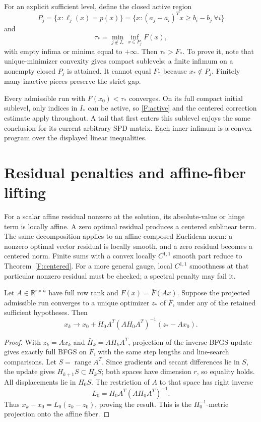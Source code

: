 For an explicit sufficient level, define the closed active region
\[
 P_j=\{x:\ell_j(x)=p(x)\}
 =\{x:(a_j-a_i)^Tx\ge b_i-b_j\ \forall i\}
\]
and
\begin{equation}\label{F:basin}
 \tau_* =\min_{j\notin I_*}\inf_{x\in P_j}F(x),
\end{equation}
with empty infima or minima equal to $+\infty$. Then $\tau_*>F_*$. To prove it, note that unique-minimizer convexity gives compact sublevels; a finite infimum on a nonempty closed $P_j$ is attained. It cannot equal $F_*$ because $x_*\notin P_j$. Finitely many inactive pieces preserve the strict gap.

Every admissible run with $F(x_0)<\tau_*$ converges. On its full compact initial sublevel, only indices in $I_*$ can be active, so \eqref{F:active} and the centered correction estimate apply throughout. A tail that first enters this sublevel enjoys the same conclusion for its current arbitrary SPD matrix. Each inner infimum is a convex program over the displayed linear inequalities.



\section{Residual penalties and affine-fiber lifting}

For a scalar affine residual nonzero at the solution, its absolute-value or hinge term is locally affine. A zero optimal residual produces a centered sublinear term. The same decomposition applies to an affine-composed Euclidean norm: a nonzero optimal vector residual is locally smooth, and a zero residual becomes a centered norm. Finite sums with a convex locally $C^{1,1}$ smooth part reduce to Theorem~\ref{F:centered}. For a more general gauge, local $C^{1,1}$ smoothness at that particular nonzero residual must be checked; a spectral penalty may fail it.

\begin{theorem}\label{F:lifting}
Let $A\in\mathbb R^{r\times n}$ have full row rank and $F(x)=\bar F(Ax)$. Suppose the projected admissible run converges to a unique optimizer $z_*$ of $\bar F$, under any of the retained sufficient hypotheses. Then
\[
 x_k\to x_0+H_0A^T(AH_0A^T)^{-1}(z_*-Ax_0).
\]
\end{theorem}
\begin{proof}
With $z_k=Ax_k$ and $\bar H_k=AH_kA^T$, projection of the inverse-BFGS update gives exactly full BFGS on $\bar F$, with the same step lengths and line-search comparisons. Let $S=\operatorname{range}A^T$. Since gradients and secant differences lie in $S$, the update gives $H_{k+1}S\subset H_kS$; both spaces have dimension $r$, so equality holds. All displacements lie in $H_0S$. The restriction of $A$ to that space has right inverse
\[
 L_0=H_0A^T(AH_0A^T)^{-1}.
\]
Thus $x_k-x_0=L_0(z_k-z_0)$, proving the result. This is the $H_0^{-1}$-metric projection onto the affine fiber.
\end{proof}

